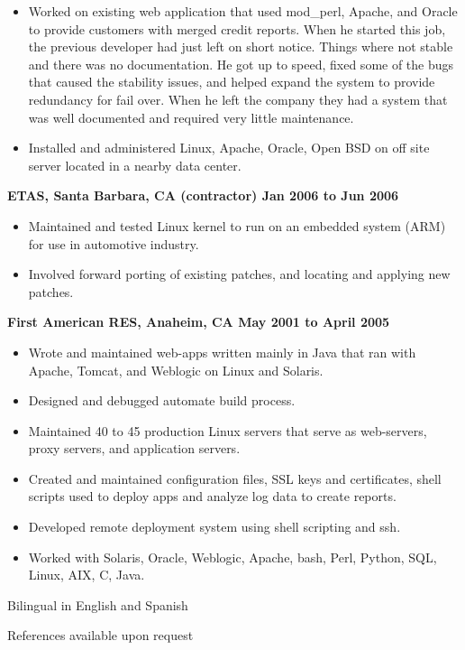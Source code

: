\documentclass{res}
\begin{document}
\begin{resume}
\begin{itemize}
\item Worked on existing web application that used mod\_perl, Apache,
and Oracle to provide customers with merged credit reports.  When he
started this job, the previous developer had just left on short notice.
Things where not stable and there was no documentation.  He got up to
speed, fixed some of the bugs that caused the stability issues, and
helped expand the system to provide redundancy for fail over.  When he
left the company they had a system that was well documented and required
very little maintenance.

\item Installed and administered Linux, Apache, Oracle, Open BSD on off
site server located in a nearby data center.

\end{itemize}

{\large \bf ETAS, Santa Barbara, CA (contractor) \hfill Jan 2006 to Jun 2006}
\begin{itemize}

\item Maintained and tested Linux kernel to run on an embedded system
(ARM) for use in automotive industry.

\item Involved forward porting of existing patches, and locating and
applying new patches.

\end{itemize}


{\large \bf First American RES, Anaheim, CA \hfill May 2001 to April 2005}
\begin{itemize}

\item Wrote and maintained web-apps written mainly in Java that ran with
Apache, Tomcat, and Weblogic on Linux and Solaris.

\item Designed and debugged automate build process.

\item Maintained 40 to 45 production Linux servers that serve as
web-servers, proxy servers, and application servers.

\item Created and maintained configuration files, SSL keys and
certificates, shell scripts used to deploy apps and analyze log data to
create reports.

\item Developed remote deployment system using shell scripting and ssh.

\item  Worked with Solaris, Oracle, Weblogic, Apache, bash, Perl,
Python, SQL, Linux, AIX, C, Java.

\end{itemize}


Bilingual in English and Spanish

References available upon request

\end{resume}
\end{document}
